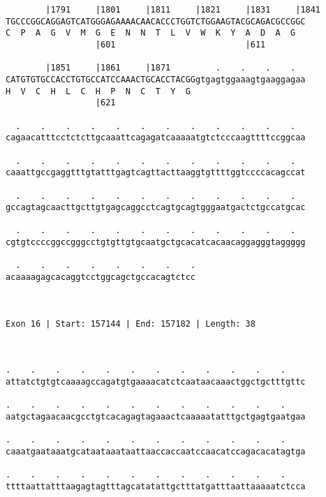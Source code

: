 \documentclass{article}
\begin{document}
\begin{Verbatim}
        |1791     |1801     |1811     |1821     |1831     |1841
TGCCCGGCAGGAGTCATGGGAGAAAACAACACCCTGGTCTGGAAGTACGCAGACGCCGGC
C  P  A  G  V  M  G  E  N  N  T  L  V  W  K  Y  A  D  A  G  
                  |601                          |611        
  
        |1851     |1861     |1871         .    .    .    .  
CATGTGTGCCACCTGTGCCATCCAAACTGCACCTACGGgtgagtggaaagtgaaggagaa
H  V  C  H  L  C  H  P  N  C  T  Y  G                       
                  |621                                      
  
  .    .    .    .    .    .    .    .    .    .    .    .  
cagaacatttcctctcttgcaaattcagagatcaaaaatgtctcccaagttttccggcaa
                                                            
  .    .    .    .    .    .    .    .    .    .    .    .  
caaattgccgaggtttgtatttgagtcagttacttaaggtgttttggtccccacagccat
                                                            
  .    .    .    .    .    .    .    .    .    .    .    .  
gccagtagcaacttgcttgtgagcaggcctcagtgcagtgggaatgactctgccatgcac
                                                            
  .    .    .    .    .    .    .    .    .    .    .    .  
cgtgtccccggccgggcctgtgttgtgcaatgctgcacatcacaacaggagggtaggggg
                                                            
  .    .    .    .    .    .    .    .
acaaaagagcacaggtcctggcagctgccacagtctcc
                                      
                                      
 
Exon 16 | Start: 157144 | End: 157182 | Length: 38



.    .    .    .    .    .    .    .    .    .    .    .    
attatctgtgtcaaaagccagatgtgaaaacatctcaataacaaactggctgctttgttc
                                                            
.    .    .    .    .    .    .    .    .    .    .    .    
aatgctagaacaacgcctgtcacagagtagaaactcaaaaatatttgctgagtgaatgaa
                                                            
.    .    .    .    .    .    .    .    .    .    .    .    
caaatgaataaatgcataataaataattaaccaccaatccaacatccagacacatagtga
                                                            
.    .    .    .    .    .    .    .    .    .    .    .    
ttttaattatttaagagtagtttagcatatattgctttatgatttaattaaaaatctcca
                                                            

\end{Verbatim}
\end{document}

